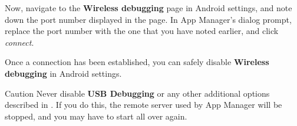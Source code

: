Now, navigate to the \textbf{Wireless debugging} page in Android settings, and note down the port number displayed in the page.
In App Manager's dialog prompt, replace the port number with the one that you have noted earlier, and click \textit{connect}.

Once a connection has been established, you can safely disable \textbf{Wireless debugging} in Android settings.

\begin{danger}{Caution}
    Never disable \textbf{USB Debugging} or any other additional options described in .
    If you do this, the remote server used by App Manager will be stopped, and you may have to start all over again.
\end{danger}
